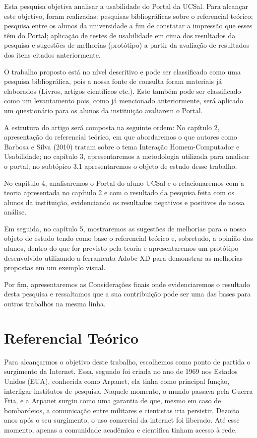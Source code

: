 \documentclass[12pt]{article}
\begin{document}
Esta pesquisa objetiva analisar a usabilidade do Portal da UCSal. Para alcançar este objetivo, foram realizadas: pesquisas bibliográficas sobre o referencial teórico; pesquisa entre os alunos da universidade a fim de constatar a impressão que esses têm do Portal; aplicação de testes de usabilidade em cima dos resultados da pesquisa e sugestões de melhorias (protótipo) a partir da avaliação de resultados dos itens citados anteriormente.

O trabalho proposto está no nível descritivo e pode ser classificado como uma pesquisa bibliográfica, pois a nossa fonte de consulta foram materiais já elaborados (Livros, artigos científicos etc.). Este também pode ser classificado como um levantamento pois, como já mencionado anteriormente, será aplicado um questionário para os alunos da instituição avaliarem o Portal.

A estrutura do artigo será composta na seguinte ordem:  No capítulo 2, apresentação do referencial teórico, em que abordaremos o que autores como Barbosa e Silva (2010) tratam sobre o tema Interação Homem-Computador e Usabilidade; no capítulo 3, apresentaremos a metodologia utilizada para analisar o portal; no subtópico 3.1 apresentaremos o objeto de estudo desse trabalho.

No capítulo 4, analisaremos o Portal do aluno UCSal e o relacionaremos com a teoria apresentada no capítulo 2 e com o resultado da pesquisa feita com os alunos da instituição, evidenciando os resultados negativos e positivos de nossa análise.

Em seguida, no capítulo 5, mostraremos as sugestões de melhorias para o nosso objeto de estudo tendo como base o referencial teórico e, sobretudo, a opinião dos alunos, dentro do que for previsto pela teoria e apresentaremos um protótipo desenvolvido utilizando a ferramenta Adobe XD para demonstrar as melhorias propostas em um exemplo visual.

Por fim,  apresentaremos as Considerações finais onde evidenciaremos o resultado desta pesquisa e ressaltamos que a sua contribuição pode ser uma das bases para outros trabalhos na mesma linha. 
\section{Referencial Teórico} \label{refTeorico}
Para alcançarmos o objetivo deste trabalho, escolhemos como ponto de partida o surgimento da Internet. 
Essa, segundo  foi criada no ano de 1969 nos Estados Unidos (EUA), conhecida como Arpanet, ela tinha como principal função, interligar institutos de pesquisa. Naquele momento, o mundo passava pela Guerra Fria, e a Arpanet surgiu como uma garantia de que, mesmo em caso de bombardeios, a comunicação entre militares e cientistas iria persistir. Dezoito anos após o seu surgimento, o uso comercial da internet foi liberado. Até esse momento, apenas a comunidade acadêmica e cientifica tinham acesso à rede.
\end{document}
